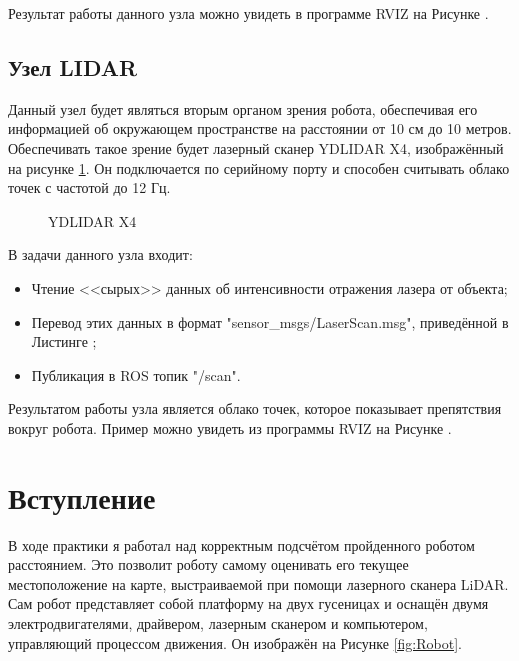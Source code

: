 \documentclass[12pt,a4paper]{scrartcl}
\begin{document}
				Результат работы данного узла можно увидеть в программе RVIZ на Рисунке .
				
			\subsection{Узел LIDAR} \label{sec:LiDAR}
				Данный узел будет являться вторым органом зрения робота, обеспечивая его информацией об окружающем пространстве на расстоянии от 10 см до 10 метров. Обеспечивать такое зрение будет лазерный сканер YDLIDAR X4, изображённый на рисунке \ref{fig:ydlidarx4}\cite{bib:ydlidarx4}. Он подключается по серийному порту и способен считывать облако точек с частотой до 12 Гц\cite{bib:ydlidarx4}. 
				
				\begin{figure}[h]
					\caption{YDLIDAR X4}
					\label{fig:ydlidarx4}
				\end{figure}
				
				В задачи данного узла входит:
				\begin{itemize}
					\item Чтение <<сырых>> данных об интенсивности отражения лазера от объекта;
					\item Перевод этих данных в формат "sensor\_msgs/LaserScan.msg", приведённой в Листинге  ;
					\item Публикация в ROS топик "/scan".
				\end{itemize}
				
				Результатом работы узла является облако точек, которое показывает препятствия вокруг робота\cite{bib:lidarDescription}. Пример можно увидеть из программы RVIZ на Рисунке .

		
		\section*{Вступление}
			В ходе практики я работал над корректным подсчётом пройденного роботом расстоянием. Это позволит роботу самому оценивать его текущее местоположение на карте, выстраиваемой при помощи лазерного сканера LiDAR. Сам робот представляет собой платформу на двух гусеницах и оснащён двумя электродвигателями, драйвером, лазерным сканером и компьютером, управляющий процессом движения. Он изображён на Рисунке \ref{fig:Robot}.
			
\end{document}
